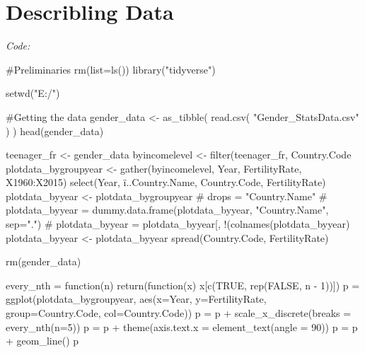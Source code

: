 \section{Describling Data}
\textit{Code: }
\begin{spverbatim}
#Preliminaries
rm(list=ls())
library("tidyverse")

setwd("E:/")

#Getting the data
gender_data <- as_tibble( read.csv( "Gender_StatsData.csv" ) )
head(gender_data)

teenager_fr <- gender_data %
byincomelevel <- filter(teenager_fr, Country.Code%
plotdata_bygroupyear <- gather(byincomelevel, Year, FertilityRate, X1960:X2015) %
  select(Year, ï..Country.Name, Country.Code, FertilityRate)
plotdata_byyear <- plotdata_bygroupyear
# drops = "Country.Name"
# plotdata_byyear = dummy.data.frame(plotdata_byyear, "Country.Name", sep=".")
# plotdata_byyear = plotdata_byyear[, !(colnames(plotdata_byyear) %
plotdata_byyear <- plotdata_byyear %
  spread(Country.Code, FertilityRate)

rm(gender_data)

every_nth = function(n) {
  return(function(x) {x[c(TRUE, rep(FALSE, n - 1))]})
}
p = ggplot(plotdata_bygroupyear, aes(x=Year, y=FertilityRate, group=Country.Code, col=Country.Code))
p = p + scale_x_discrete(breaks = every_nth(n=5))
p = p + theme(axis.text.x = element_text(angle = 90))
p = p + geom_line()
p
\end{spverbatim}